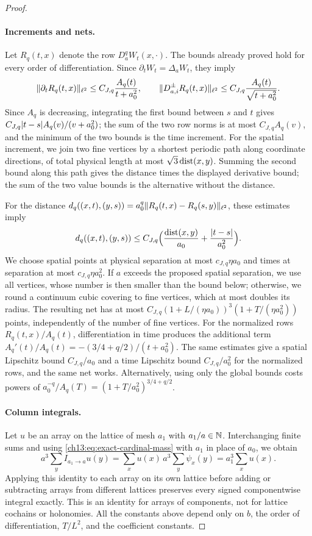 \begin{proof}
\paragraph{Increments and nets.}
Let $R_q(t,x)$ denote the row $D_a^qW_t(x,\cdot)$. The bounds already proved hold for every order of differentiation. Since $\partial_tW_t=\Delta_aW_t$, they imply
\[
 \lVert \partial_tR_q(t,x)\rVert_{\ell^2}\le C_{J,q}\frac{A_q(t)}{t+a_0^2},\qquad
 \lVert D_{a,i}^{\pm}R_q(t,x)\rVert_{\ell^2}\le C_{J,q}\frac{A_q(t)}{\sqrt{t+a_0^2}}.
\]
Since $A_q$ is decreasing, integrating the first bound between $s$ and $t$ gives $C_{J,q}\lvert t-s\rvert A_q(v)/(v+a_0^2)$; the sum of the two row norms is at most $C_{J,q}A_q(v)$, and the minimum of the two bounds is the time increment. For the spatial increment, we join two fine vertices by a shortest periodic path along coordinate directions, of total physical length at most $\sqrt3\operatorname{dist}(x,y)$. Summing the second bound along this path gives the distance times the displayed derivative bound; the sum of the two value bounds is the alternative without the distance.

For the distance $d_q((x,t),(y,s))=a_0^q\lVert R_q(t,x)-R_q(s,y)\rVert_{\ell^2}$, these estimates imply
\[
 d_q((x,t),(y,s))\le C_{J,q}\Bigl(\frac{\operatorname{dist}(x,y)}{a_0}+\frac{\lvert t-s\rvert}{a_0^2}\Bigr).
\]
We choose spatial points at physical separation at most $c_{J,q}\eta a_0$ and times at separation at most $c_{J,q}\eta a_0^2$. If $a$ exceeds the proposed spatial separation, we use all vertices, whose number is then smaller than the bound below; otherwise, we round a continuum cubic covering to fine vertices, which at most doubles its radius. The resulting net has at most $C_{J,q}(1+L/(\eta a_0))^3(1+T/(\eta a_0^2))$ points, independently of the number of fine vertices. For the normalized rows $R_q(t,x)/A_q(t)$, differentiation in time produces the additional term $A_q'(t)/A_q(t)=-(3/4+q/2)/(t+a_0^2)$. The same estimates give a spatial Lipschitz bound $C_{J,q}/a_0$ and a time Lipschitz bound $C_{J,q}/a_0^2$ for the normalized rows, and the same net works. Alternatively, using only the global bounds costs powers of $a_0^{-q}/A_q(T)=(1+T/a_0^2)^{3/4+q/2}$. 

\paragraph{Column integrals.}
Let $u$ be an array on the lattice of mesh $a_1$ with $a_1/a\in\mathbb N$. Interchanging finite sums and using \eqref{ch13:eq:exact-cardinal-mass} with $a_1$ in place of $a_0$, we obtain
\[
 a^3\sum_yI_{a_1\to a}u(y)=\sum_xu(x)\,a^3\sum_y\psi_x(y)=a_1^3\sum_xu(x).
\]
Applying this identity to each array on its own lattice before adding or subtracting arrays from different lattices preserves every signed componentwise integral exactly. This is an identity for arrays of components, not for lattice cochains or holonomies. All the constants above depend only on $b$, the order of differentiation, $T/L^2$, and the coefficient constants.
\end{proof}


